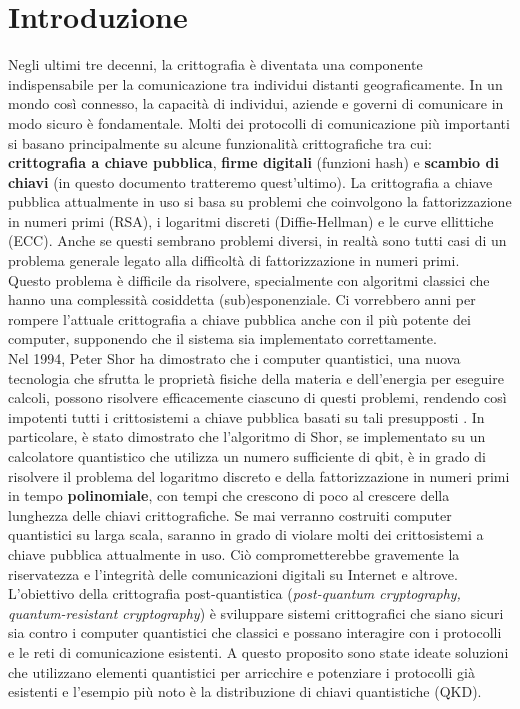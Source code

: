 \setcounter{page}{1}
\chapter*{Introduzione}
Negli ultimi tre decenni, la crittografia è diventata una componente indispensabile per la comunicazione tra individui distanti geograficamente. In un mondo così connesso, la capacità di individui, aziende e governi di comunicare in modo sicuro è fondamentale. 
Molti dei protocolli di comunicazione più importanti si basano principalmente su alcune funzionalità crittografiche tra cui: \textbf{crittografia a chiave pubblica}, \textbf{firme digitali} (funzioni hash) e \textbf{scambio di chiavi} (in questo documento tratteremo quest'ultimo). La crittografia a chiave pubblica attualmente in uso si basa su problemi che coinvolgono la fattorizzazione in numeri primi (RSA), i logaritmi discreti (Diffie-Hellman) e le curve ellittiche (ECC).
Anche se questi sembrano problemi diversi, in realtà sono tutti casi di un problema generale legato alla difficoltà di fattorizzazione in numeri primi.\\
Questo problema è difficile da risolvere, specialmente con algoritmi classici che hanno una complessità cosiddetta (sub)esponenziale. Ci vorrebbero anni per rompere l’attuale crittografia a chiave pubblica anche con il più potente dei computer, supponendo che il sistema sia implementato correttamente.\\
Nel 1994, Peter Shor ha dimostrato che i computer quantistici, una nuova tecnologia che sfrutta le proprietà fisiche della materia e dell'energia per eseguire calcoli, possono risolvere efficacemente ciascuno di questi problemi, rendendo così impotenti tutti i crittosistemi a chiave pubblica basati su tali presupposti \cite{shor_polynomial-time_1997}. In particolare, è stato dimostrato che l'algoritmo di Shor, se implementato su un calcolatore quantistico che utilizza un numero sufficiente di qbit, è in grado di risolvere il problema del logaritmo discreto e della fattorizzazione in numeri primi in tempo \textbf{polinomiale}, con tempi che crescono di poco al crescere della lunghezza delle chiavi crittografiche. Se mai verranno costruiti computer quantistici su larga scala, saranno in grado di violare molti dei crittosistemi a chiave pubblica attualmente in uso. Ciò comprometterebbe gravemente la riservatezza e l'integrità delle comunicazioni digitali su Internet e altrove. L'obiettivo della crittografia post-quantistica (\textit{post-quantum cryptography, quantum-resistant cryptography}) è sviluppare sistemi crittografici che siano sicuri sia contro i computer quantistici che classici e possano interagire con i protocolli e le reti di comunicazione esistenti. A questo proposito sono state ideate soluzioni che utilizzano elementi quantistici per arricchire e potenziare i protocolli già esistenti e l'esempio più noto è la distribuzione di chiavi quantistiche (QKD).
